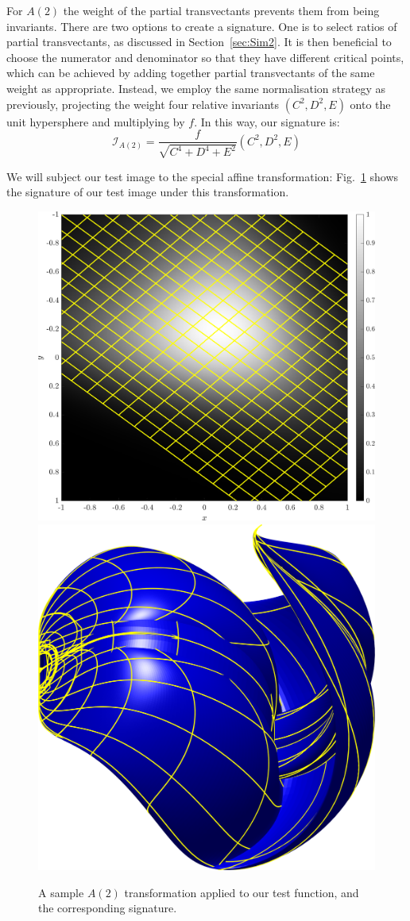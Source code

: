\documentclass{artjlt}
\begin{document}
For $A(2)$ the weight of the partial transvectants prevents them from being
invariants. There are two options to create a signature. One is to select
ratios of partial transvectants, as discussed in
Section~\ref{sec:Sim2}. It is then beneficial to choose the
numerator and denominator so that they have different critical points,
which can be achieved by adding together partial transvectants of the same
weight as appropriate. Instead, we employ the same normalisation strategy
as previously, projecting the weight four relative invariants $(C^2, D^2,
E)$ onto the unit hypersphere and multiplying by $f$. In this way, our
signature is:
\begin{equation}
    \label{eq:A2signature}
    \mathcal{I}_{A(2)} = \frac{f}{\sqrt{C^4 + D^4 + E^2}}(C^2, D^2, E)
\end{equation}

We will subject our test image to the special affine transformation:
Fig.~\ref{fig:A2} shows the signature of our test image under this transformation.
\begin{figure}
\centering
\includegraphics[width=.45\textwidth]{Figs/f_transformed_A2.png}
\includegraphics[width=.45\textwidth]{Figs/A2_signature.png}
\caption{A sample $A(2)$ transformation applied to our test function, and the corresponding signature.}
\label{fig:A2}
\end{figure}
\end{document}
